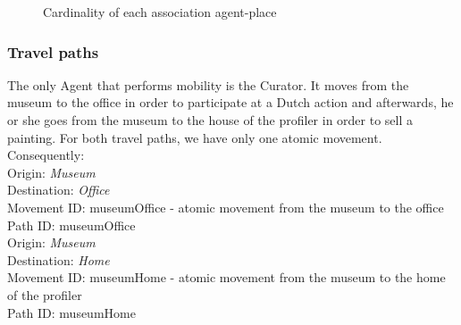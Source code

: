 \documentclass[a4paper,11pt]{report}
\begin{document}
  \begin{figure}[ht!]
   \centering
   
   \caption{Cardinality of each association agent-place}
   \label{figure:mobility_cardinality}
  \end{figure}

  
  \subsubsection{Travel paths}
  The only Agent that performs mobility is the Curator. It moves from the museum
  to the office in order to participate at a Dutch action and afterwards, he or she
  goes from the museum to the house of the profiler in order to sell a painting.
  For both travel paths, we have only one atomic movement. Consequently:\\
  Origin: \textit{Museum}\\
  Destination: \textit{Office}\\
  Movement ID: museumOffice - atomic movement from the museum to the office\\
  Path ID: museumOffice\\
  
  Origin: \textit{Museum}\\
  Destination: \textit{Home}\\
  Movement ID: museumHome - atomic movement from the museum to the home of the profiler\\
  Path ID: museumHome
  
\end{document}
